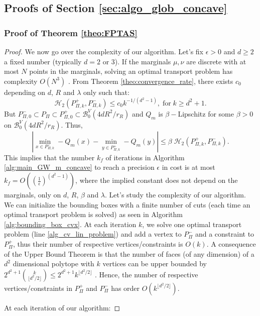 \documentclass{article}
\newcommand{\1}{\mathbf{1}}
\theoremstyle{definition}
\theoremstyle{remark}
\begin{document}
\begin{appendices}
\subsection{Proofs of Section \ref{sec:algo_glob_concave}}\label{sec:sup_alg_theo}

\subsubsection*{Proof of Theorem \ref{theo:FPTAS}}
\begin{proof}
    We now go over the complexity of our algorithm. Let's fix $\epsilon>0$ and $d\geq2$ a fixed number (typically $d=2$ or $3$). If the marginals $\mu,\nu$ are discrete with at most $N$ points in the marginals, solving an optimal transport problem has complexity $O(N^3)$ \cite[Section 3.7]{peyre2019computational}. From Theorem \ref{theo:convergence_rate}, there exists $c_0$ depending on $d$, $R$ and $\lambda$ only such that:
    \[\mathcal{H}_2(P_{\Pi,k}^+,P_{\Pi,k}^-)\leq c_0k^{-1/(d^2-1)},\;\mathrm{for}\; k\geq d^2+1.\]
    But  $P_{\Pi,0}^-\subset P_{\Pi}\subset P_{\Pi,0}^+\subset \mathcal{B}^V_{0}(4dR^2/r_R)$ and $Q_m$ is $\beta-$Lipschitz for some $\beta>0$ on $\mathcal{B}^V_{0}(4dR^2/r_R)$. Thus, \[|\min_{x\in P_{\Pi,k}^-}-Q_m(x)-\min_{y\in P_{\Pi,k}^+}-Q_m(y)|\leq \beta\;\mathcal{H}_2(P_{\Pi,k}^+,P_{\Pi,k}^-).\]
    This implies that the number $k_f$ of iterations in Algorithm \ref{alg:main_GW_m_concave} to reach a precision $\epsilon$ in cost is at most $k_f=O\left((\frac{1}{\epsilon})^{(d^2-1)}\right)$, where the implied constant does not depend on the marginals, only on $d$, $R$, $\beta$ and $\lambda$. 
    Let's study the complexity of our algorithm. We can initialize the bounding boxes with a finite number of cuts (each time an optimal transport problem is solved) as seen in Algorithm \ref{alg:bounding_box_cvx}.  At each iteration $k$, we solve one optimal transport problem (line \ref{alg_cv_lin_problem}) and add a vertex to $P_\Pi^-$ and a constraint to $P_\Pi^+$, thus their number of respective vertices/constraints is $O(k)$. A consequence of the  Upper Bound Theorem is that the number of faces (of any dimension) of a $d^2$ dimensional polytope with $k$ vertices can be upper bounded by $2^{d^2+1} \binom{k}{\lfloor d^2/2\rfloor}\leq 2^{d^2+1} k^{\lfloor d^2/2\rfloor}$ \cite[Section 5.5]{matouvsek2002lectures}. Hence, the number of respective vertices/constraints in $P_\Pi^+$ and $P_\Pi^-$ has order $O(k^{\lfloor d^2/2\rfloor})$.

    
    At each iteration of our algorithm:
    

\end{proof}
\end{appendices}
\end{document}
